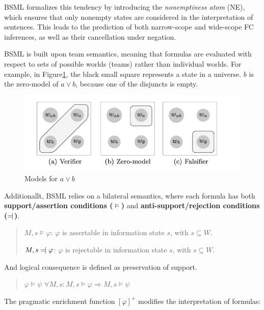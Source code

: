 BSML formalizes this tendency by introducing the \textit{nonemptiness atom} (NE), which ensures that only nonempty states are considered in the interpretation of sentences. 
This leads to the prediction of both narrow-scope and wide-scope FC inferences, as well as their cancellation under negation.

BSML is built upon team semantics, meaning that formulas are evaluated with respect to sets of possible worlds (teams) rather than individual worlds. 
For example, in Figure\ref{disjunct}, the black small square represents a state in a universe. \(b\) is the zero-model of \( a \vee b \), because one of the disjuncts is empty.

\begin{figure}[h]
    \centering
    \includegraphics[width=\textwidth]{image/disj1.png}
    \caption{Models for \( a \vee b \)}\label{disjunct}
\end{figure}

Additionallt, BSML relies on a bilateral semantics, where each formula has both \textbf{support/assertion conditions ($\models$)} and \textbf{anti-support/rejection conditions ($\leftmodels$)}.

\begin{quote}
    $M, s \models \varphi$: \( \varphi \) is assertable in information state \( s \), with \( s \subseteq W \).

    $M, s \leftmodels \varphi$: $\varphi$ is rejectable in information state $s$, with $s \subseteq W$.
\end{quote}

And logical consequence is defined as preservation of support. 

\begin{quote}
\(\varphi \models \psi\) \quad {} \quad $\forall M, s : M, s \models \varphi \Rightarrow M, s \models \psi$
\end{quote}


The pragmatic enrichment function \({[ \varphi ]}^+\) modifies the interpretation of formulas:


